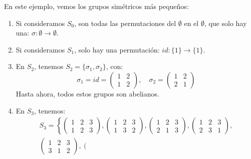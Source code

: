 \begin{ejemplo}
En este ejemplo, vemos los grupos simétricos más pequeños:
\begin{enumerate}
    \item Si consideramos $S_0$, son todas las permutaciones del $\emptyset $ en el $\emptyset $, que solo hay una: $\sigma:\emptyset\rightarrow\emptyset $.
    \item Si consideramos $S_1$, solo hay una permutación: $id:\{1\}\rightarrow\{1\}$.
    \item En $S_2$, tenemos $S_2 = \{\sigma_1, \sigma_2\}$, con:
        \begin{equation*}
            \sigma_1 = id = \left(\begin{array}{cc}
                1 & 2 \\
                1 & 2 
            \end{array}\right), \quad \sigma_2 = \left(\begin{array}{cc}
                1 & 2 \\
                2 & 1 
            \end{array}\right)
        \end{equation*}
        Hasta ahora, todos estos grupos son abelianos.
    \item En $S_3$, tenemos:
        \begin{multline*}
            S_3 = \left\{\left(\begin{array}{ccc}
                1 & 2 & 3 \\
                1 & 2 & 3
            \end{array}\right), \left(\begin{array}{ccc}
                1 & 2 & 3 \\
                1 & 3 & 2
            \end{array}\right), \left(\begin{array}{ccc}
                1 & 2 & 3 \\
                2 & 1 & 3
            \end{array}\right), \left(\begin{array}{ccc}
                1 & 2 & 3 \\
                2 & 3 & 1
            \end{array}\right), \right. \\ \left. \left(\begin{array}{ccc}
                1 & 2 & 3 \\
                3 & 1 & 2
            \end{array}\right), \left(\begin{array}{ccc}

\end{array}
\end{multline*}
\end{enumerate}
\end{ejemplo}
